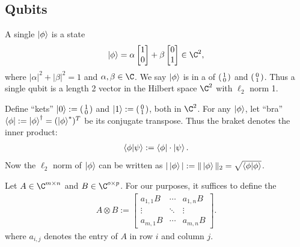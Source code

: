 \subsection{Qubits}

\begin{definition} A single  $\ket\phi$ is a state
\begin{align}
    \ket\phi = \alpha\vect{1}{0} + \beta\vect{0}{1} \in \C^2,
\end{align}
where $|\alpha|^2 + |\beta|^2 = 1$ and $\alpha, \beta \in \C$. We say $\ket\phi$ is in a  of $\left(\begin{smallmatrix}1\\0\end{smallmatrix}\right)$ and $\left(\begin{smallmatrix}0\\1\end{smallmatrix}\right)$. Thus a single qubit is a length 2 vector in the Hilbert space $\C^2$ with $\ell_2$ norm 1.
\end{definition}

\begin{definition}
Define ``kets'' $\ket{0} := \left(\begin{smallmatrix}1\\0\end{smallmatrix}\right)$ and $\ket{1} := \left(\begin{smallmatrix}0\\1\end{smallmatrix}\right)$, both in $\C^2$. For any $\ket\phi$, let ``bra'' $\bra\phi := \ket\phi^\dagger = (\ket\phi^*)^T$ be its conjugate transpose. Thus the braket denotes the inner product:
\begin{align}
    \braket{\phi}{\psi}
    := \bra{\phi} \cdot \ket{\psi}.
\end{align}
Now the $\ell_2$ norm of $\ket{\phi}$ can be written as $|\ket{\phi}| := \|\ket\phi\|_2 =  \sqrt{\braket{\phi}{\phi}}$.
\end{definition}

\begin{definition}
Let $A \in \C^{m \times n}$ and $B \in \C^{o \times p}$. For our purposes, it suffices to define the 
\begin{align}
    A \otimes B :=
    \begin{bmatrix}
        a_{1,1}B & \cdots & a_{1,n}B \\
        \vdots  & \ddots & \vdots \\
        a_{m,1}B & \cdots & a_{m,n}B
    \end{bmatrix}.
\end{align}
where \(a_{i,j}\) denotes the entry of \(A\) in row \(i\) and column \(j\).
\end{definition}

